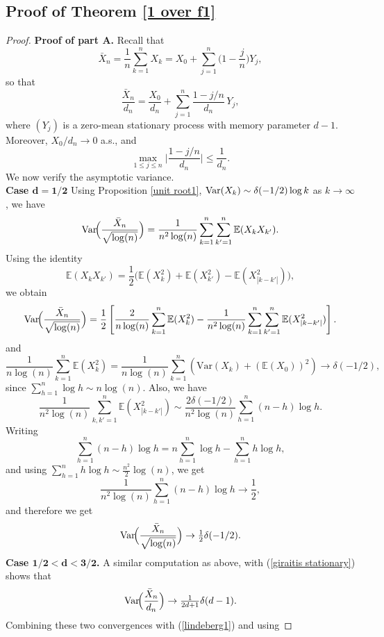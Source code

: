 \documentclass[12pt]{article}
\numberwithin{equation}{section}
\newcommand{\Var}{{\rm Var}}
\begin{document}
\subsection{Proof of Theorem \ref{1 over f1}}
\begin{proof}
\noindent\textbf{Proof of part A.}
Recall that
\[
\bar X_n=\frac1n\sum_{k=1}^n X_k
=X_0+\sum_{j=1}^n\Big(1-\frac{j}{n}\Big)Y_j,
\]
so that
\[
\frac{\bar X_n}{d_n}
=\frac{X_0}{d_n}+\sum_{j=1}^n \frac{1-j/n}{d_n}\,Y_j,
\]
where $(Y_j)$ is a zero-mean stationary process with memory parameter $d-1.$ Moreover, $X_0/d_n\to0$ a.s., and
\begin{equation}\label{lindeberg1}
\max_{1\le j\le n}\Big|\frac{1-j/n}{d_n}\Big|
\le \frac{1}{d_n}.
\end{equation}
We now verify the asymptotic variance.\\
{\bf Case $\mathbf{d=1/2}$}
Using Proposition \ref{unit root1},   $\Var(X_k)\sim \delta(-1/2)\log k$ as $k\to\infty$, we have
\[
\Var\!\Big(\frac{\bar X_n}{\sqrt{\log(n)}}\Big)
=\frac{1}{n^2\log(n)}\sum_{k=1}^n\sum_{k'=1}^n \mathbb E(X_kX_{k'}).
\]
Using the identity
\[
\mathbb E(X_kX_{k'})
=\frac12\bigl(\mathbb E(X_k^2)+\mathbb E(X_{k'}^2)
-\mathbb E(X_{|k-k'|}^2)\bigr),
\]
we obtain
\[
\Var\!\Big(\frac{\bar X_n}{\sqrt{\log(n)}}\Big)
=\frac12\left[
\frac{2}{n\log(n)}\sum_{k=1}^n \mathbb E(X_k^2)
-\frac{1}{n^2\log(n)}\sum_{k=1}^n\sum_{k'=1}^n \mathbb E(X_{|k-k'|}^2)
\right].
\]
and
\begin{equation}\label{var log n}
\frac{1}{n\log(n)}\sum_{k=1}^n \mathbb E(X_k^2)=\frac{1}{n\log(n)}\sum_{k=1}^n\left(\textrm{Var}(X_k)+(\mathbb{E}(X_0))^2\right)\to \delta(-1/2),
\end{equation}
since $\sum_{h=1}^n \log h\sim n\log(n)$.
Also, we have
\[
\frac{1}{n^2\log(n)}\sum_{k,k'=1}^n \mathbb E(X_{|k-k'|}^2)
\sim \frac{2\delta(-1/2)}{n^2\log(n)}\sum_{h=1}^{n}(n-h)\log h.
\]
Writing
\[
\sum_{h=1}^{n}(n-h)\log h
=
n\sum_{h=1}^n \log h-\sum_{h=1}^n h\log h,
\]
and using  
$\sum_{h=1}^n h\log h\sim \frac{n^2}{2}\log(n)$, we get
\[
\frac{1}{n^2\log(n)}\sum_{h=1}^{n}(n-h)\log h \to \frac12,
\]
and therefore we get
\begin{equation}\label{1/2 variance}
\Var\!\Big(\frac{\bar X_n}{\sqrt{\log(n)}}\Big)\to \tfrac12\delta(-1/2).
\end{equation}
{\bf Case $\mathbf{1/2<d<3/2}$.} A similar  computation as above, with (\ref{giraitis stationary}) shows that
$$
\Var\!\Big(\frac{\bar X_n}{d_n}\Big)\to \tfrac1{2d+1}\delta(d-1).
$$
Combining these two convergences  with  (\ref{lindeberg1}) and using 

\end{proof}
\end{document}
